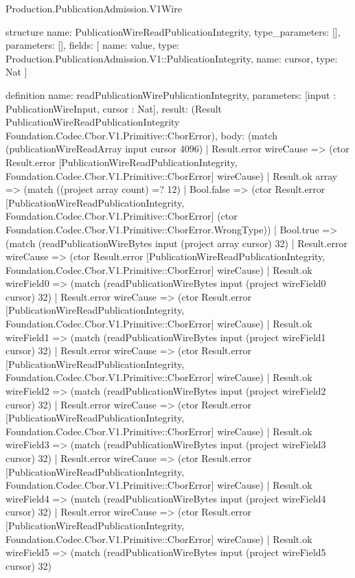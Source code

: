 \begin{lexlean}{Production.PublicationAdmission.V1Wire}
\begin{semanticmodule}
structure{
  name: PublicationWireReadPublicationIntegrity,
  type_parameters: [],
  parameters: [],
  fields: [
    {name: value, type: Production.PublicationAdmission.V1::PublicationIntegrity},
    {name: cursor, type: Nat}
  ]
}

definition{
  name: readPublicationWirePublicationIntegrity,
  parameters: [input : PublicationWireInput, cursor : Nat],
  result: (Result PublicationWireReadPublicationIntegrity Foundation.Codec.Cbor.V1.Primitive::CborError),
  body: (match (publicationWireReadArray input cursor 4096)
    | Result.error wireCause => (ctor Result.error [PublicationWireReadPublicationIntegrity, Foundation.Codec.Cbor.V1.Primitive::CborError] wireCause)
    | Result.ok array => (match ((project array count) =? 12)
      | Bool.false => (ctor Result.error [PublicationWireReadPublicationIntegrity, Foundation.Codec.Cbor.V1.Primitive::CborError] (ctor Foundation.Codec.Cbor.V1.Primitive::CborError.WrongType))
      | Bool.true => (match (readPublicationWireBytes input (project array cursor) 32)
        | Result.error wireCause => (ctor Result.error [PublicationWireReadPublicationIntegrity, Foundation.Codec.Cbor.V1.Primitive::CborError] wireCause)
        | Result.ok wireField0 => (match (readPublicationWireBytes input (project wireField0 cursor) 32)
          | Result.error wireCause => (ctor Result.error [PublicationWireReadPublicationIntegrity, Foundation.Codec.Cbor.V1.Primitive::CborError] wireCause)
          | Result.ok wireField1 => (match (readPublicationWireBytes input (project wireField1 cursor) 32)
            | Result.error wireCause => (ctor Result.error [PublicationWireReadPublicationIntegrity, Foundation.Codec.Cbor.V1.Primitive::CborError] wireCause)
            | Result.ok wireField2 => (match (readPublicationWireBytes input (project wireField2 cursor) 32)
              | Result.error wireCause => (ctor Result.error [PublicationWireReadPublicationIntegrity, Foundation.Codec.Cbor.V1.Primitive::CborError] wireCause)
              | Result.ok wireField3 => (match (readPublicationWireBytes input (project wireField3 cursor) 32)
                | Result.error wireCause => (ctor Result.error [PublicationWireReadPublicationIntegrity, Foundation.Codec.Cbor.V1.Primitive::CborError] wireCause)
                | Result.ok wireField4 => (match (readPublicationWireBytes input (project wireField4 cursor) 32)
                  | Result.error wireCause => (ctor Result.error [PublicationWireReadPublicationIntegrity, Foundation.Codec.Cbor.V1.Primitive::CborError] wireCause)
                  | Result.ok wireField5 => (match (readPublicationWireBytes input (project wireField5 cursor) 32)
}
\end{semanticmodule}
\end{lexlean}
